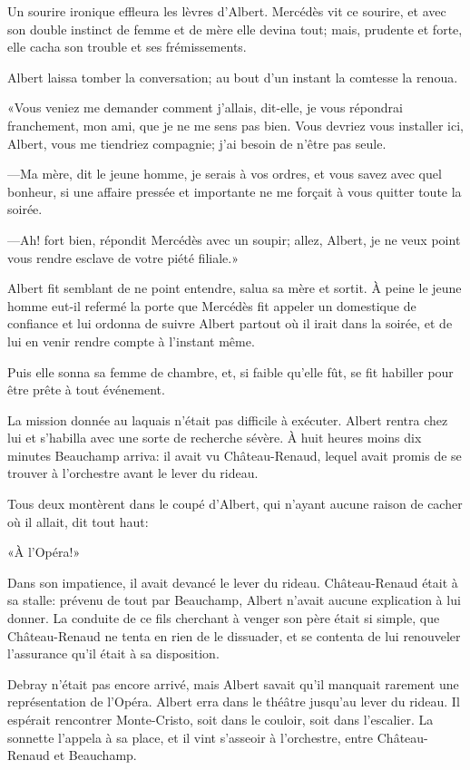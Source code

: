 Un sourire ironique effleura les lèvres d'Albert. Mercédès vit ce sourire, et avec son double instinct de femme et de mère elle devina tout; mais, prudente et forte, elle cacha son trouble et ses frémissements. 

Albert laissa tomber la conversation; au bout d'un instant la comtesse la renoua. 

«Vous veniez me demander comment j'allais, dit-elle, je vous répondrai franchement, mon ami, que je ne me sens pas bien. Vous devriez vous installer ici, Albert, vous me tiendriez compagnie; j'ai besoin de n'être pas seule. 

—Ma mère, dit le jeune homme, je serais à vos ordres, et vous savez avec quel bonheur, si une affaire pressée et importante ne me forçait à vous quitter toute la soirée. 

—Ah! fort bien, répondit Mercédès avec un soupir; allez, Albert, je ne veux point vous rendre esclave de votre piété filiale.» 

Albert fit semblant de ne point entendre, salua sa mère et sortit. À peine le jeune homme eut-il refermé la porte que Mercédès fit appeler un domestique de confiance et lui ordonna de suivre Albert partout où il irait dans la soirée, et de lui en venir rendre compte à l'instant même. 

Puis elle sonna sa femme de chambre, et, si faible qu'elle fût, se fit habiller pour être prête à tout événement. 

La mission donnée au laquais n'était pas difficile à exécuter. Albert rentra chez lui et s'habilla avec une sorte de recherche sévère. À huit heures moins dix minutes Beauchamp arriva: il avait vu Château-Renaud, lequel avait promis de se trouver à l'orchestre avant le lever du rideau. 

Tous deux montèrent dans le coupé d'Albert, qui n'ayant aucune raison de cacher où il allait, dit tout haut: 

«À l'Opéra!» 

Dans son impatience, il avait devancé le lever du rideau. Château-Renaud était à sa stalle: prévenu de tout par Beauchamp, Albert n'avait aucune explication à lui donner. La conduite de ce fils cherchant à venger son père était si simple, que Château-Renaud ne tenta en rien de le dissuader, et se contenta de lui renouveler l'assurance qu'il était à sa disposition. 

Debray n'était pas encore arrivé, mais Albert savait qu'il manquait rarement une représentation de l'Opéra. Albert erra dans le théâtre jusqu'au lever du rideau. Il espérait rencontrer Monte-Cristo, soit dans le couloir, soit dans l'escalier. La sonnette l'appela à sa place, et il vint s'asseoir à l'orchestre, entre Château-Renaud et Beauchamp. 

